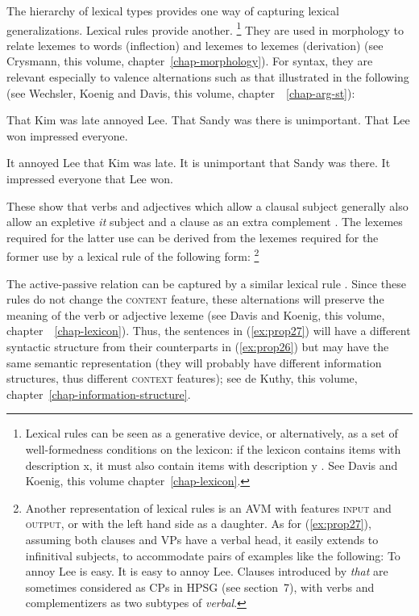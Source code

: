\documentclass[output=paper
	        ,collection
	        ,collectionchapter
 	        ,biblatex
                ,babelshorthands
                ,newtxmath
                ,draftmode
                ,colorlinks, citecolor=brown
]{langscibook}
\begin{document}
The hierarchy of lexical types provides one way of capturing lexical generalizations. Lexical rules provide another.%
%
\footnote{Lexical rules can be seen as a generative device, or alternatively, as a set of well-formedness conditions on the lexicon: if the lexicon contains items with description x, it must also contain items with description y \citep{Meurers2001a}. See Davis and Koenig, this volume chapter~\ref{chap-lexicon}.}
%
They are used in morphology to relate lexemes to words (inflection) and lexemes to lexemes (derivation) (see Crysmann, this volume, chapter~\ref{chap-morphology}). For syntax, they are relevant especially to valence alternations such as that illustrated in the following (see Wechsler, Koenig and Davis, this volume, chapter~ \ref{chap-arg-st}):

\ea\label{ex:prop26}
	\ea That Kim was late annoyed Lee.
	\ex That Sandy was there is unimportant. 
	\ex That Lee won impressed everyone.
	\z
	
\ex\label{ex:prop27}
	\ea It annoyed Lee that Kim was late.
	\ex It is unimportant that Sandy was there. 
	\ex It impressed everyone that Lee won.
	\z
\z

These show that verbs and adjectives which allow a clausal subject generally also allow an expletive \emph{it} subject and a clause as an extra complement \citep[150]{ps2}. The lexemes required for the latter use can be derived from the lexemes required for the former use by a lexical rule of the following form:%
%
\footnote{Another representation of lexical rules is an AVM with features \textsc{input} and \textsc{output}, or with the left hand side as a daughter. As for (\ref{ex:prop27}), assuming both clauses and VPs have a verbal head, it easily extends to infinitival subjects, to accommodate pairs of examples like the following:
	\ea To annoy Lee is easy.
	\ex It is easy to annoy Lee.
	\z
Clauses introduced by \emph{that} are sometimes considered as CPs in HPSG (see section~7), with verbs and complementizers as two subtypes of \emph{verbal}.
	
}
%

\ea\label{ex:prop28}
\avmtmp{[arg-st & <S> \+ \2] |$\rightarrow$
	[arg-st & <NP![\type{it}]!> \+ \2 \+ <S>]}
\z

The active-passive relation can be captured by a similar lexical rule \citep{Flickinger87}. Since these rules do not change the \textsc{content} feature, these alternations will preserve the meaning of the verb or adjective lexeme (see Davis and Koenig, this volume, chapter~ \ref{chap-lexicon}). Thus, the sentences in (\ref{ex:prop27}) will have a different syntactic structure from their counterparts in (\ref{ex:prop26}) but may have the same semantic representation (they will probably have different information structures, thus different \textsc{context} features); see de Kuthy, this volume, chapter~\ref{chap-information-structure}.
\end{document}
